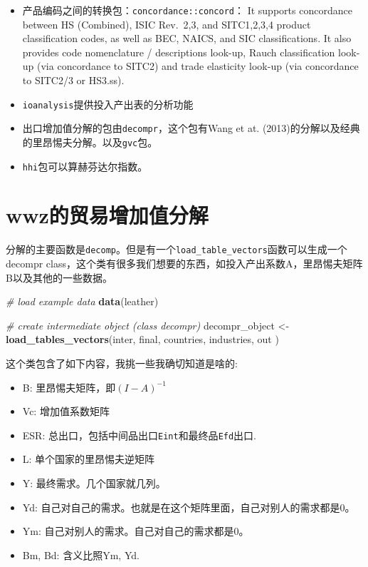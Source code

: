 \documentclass[
]{book}
\newenvironment{Shaded}{\begin{snugshade}}{\end{snugshade}}
\newcommand{\CommentTok}[1]{\textcolor[rgb]{0.56,0.35,0.01}{\textit{#1}}}
\newcommand{\KeywordTok}[1]{\textcolor[rgb]{0.13,0.29,0.53}{\textbf{#1}}}
\newcommand{\NormalTok}[1]{#1}
\newcommand{\StringTok}[1]{\textcolor[rgb]{0.31,0.60,0.02}{#1}}
\providecommand{\tightlist}{%
  \setlength{\itemsep}{0pt}\setlength{\parskip}{0pt}}
\begin{document}
\begin{itemize}
\tightlist
\item
  产品编码之间的转换包：\texttt{concordance::concord}：
  It supports concordance between HS (Combined), ISIC Rev.~2,3, and SITC1,2,3,4 product classification codes, as well as BEC, NAICS, and SIC classifications. It also provides code nomenclature / descriptions look-up, Rauch classification look-up (via concordance to SITC2) and trade elasticity look-up (via concordance to SITC2/3 or HS3.ss).
\item
  \texttt{ioanalysis}提供投入产出表的分析功能
\item
  出口增加值分解的包由\texttt{decompr}，这个包有Wang et at. (2013)的分解以及经典的里昂惕夫分解。以及\texttt{gvc}包。
\item
  \texttt{hhi}包可以算赫芬达尔指数。
\end{itemize}

\hypertarget{wwzux7684ux8d38ux6613ux589eux52a0ux503cux5206ux89e3}{%
\section{wwz的贸易增加值分解}\label{wwzux7684ux8d38ux6613ux589eux52a0ux503cux5206ux89e3}}

分解的主要函数是\texttt{decomp}。但是有一个\texttt{load\_table\_vectors}函数可以生成一个decompr class，这个类有很多我们想要的东西，如投入产出系数A，里昂惕夫矩阵B以及其他的一些数据。

\begin{Shaded}
\begin{Highlighting}[]
\CommentTok{# load example data}
\KeywordTok{data}\NormalTok{(leather)}

\CommentTok{# create intermediate object (class decompr)}
\NormalTok{decompr_object <-}\StringTok{ }\KeywordTok{load_tables_vectors}\NormalTok{(inter,}
\NormalTok{                                      final,}
\NormalTok{                                      countries,}
\NormalTok{                                      industries,}
\NormalTok{                                      out        )}
\end{Highlighting}
\end{Shaded}

这个类包含了如下内容，我挑一些我确切知道是啥的:

\begin{itemize}
\tightlist
\item
  B: 里昂惕夫矩阵，即\((I-A)^{-1}\)
\item
  Vc: 增加值系数矩阵
\item
  ESR: 总出口，包括中间品出口\texttt{Eint}和最终品\texttt{Efd}出口.
\item
  L: 单个国家的里昂惕夫逆矩阵
\item
  Y: 最终需求。几个国家就几列。
\item
  Yd: 自己对自己的需求。也就是在这个矩阵里面，自己对别人的需求都是0。
\item
  Ym: 自己对别人的需求。自己对自己的需求都是0。
\item
  Bm, Bd: 含义比照Ym, Yd.
\end{itemize}
\end{document}
